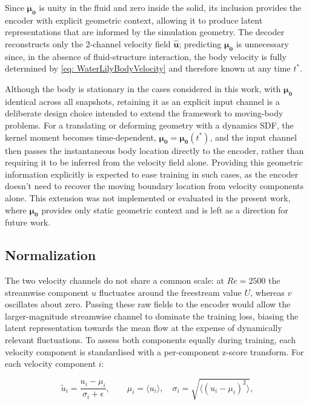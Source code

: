 Since $\boldsymbol{\mu_0}$ is unity in the fluid and zero inside the solid, its inclusion provides the encoder with explicit geometric context, allowing it to produce latent representations that are informed by the simulation geometry. The decoder reconstructs only the 2-channel velocity field $\hat{\mathbf{u}}$; predicting $\boldsymbol{\mu_0}$ is unnecessary since, in the absence of fluid-structure interaction, the body velocity is fully determined by \autoref{eq: WaterLilyBodyVelocity} and therefore known at any time $t^*$.

Although the body is stationary in the cases considered in this work, with $\boldsymbol{\mu_0}$ identical across all snapshots, retaining it as an explicit input channel is a deliberate design choice intended to extend the framework to moving-body problems. For a translating or deforming geometry with a dynamics SDF, the kernel moment becomes time-dependent, $\boldsymbol{\mu_0} = \boldsymbol{\mu_0}(t^*)$, and the input channel then passes the instantaneous body location directly to the encoder, rather than requiring it to be inferred from the velocity field alone. Providing this geometric information explicitly is expected to ease training in such cases, as the encoder doesn't need to recover the moving boundary location from velocity components alone. This extension was not implemented or evaluated in the present work, where $\boldsymbol{\mu_0}$ provides only static geometric context and is left as a direction for future work.


\subsection{Normalization}
\label{sect: normalization}

The two velocity channels do not share a common scale: at $Re=2500$ the streamwise component $u$ fluctuates around the freestream value $U$, whereas $v$ oscillates about zero. Passing these raw fields to the encoder would allow the larger-magnitude streamwise channel to dominate the training loss, biasing the latent representation towards the mean flow at the expense of dynamically relevant fluctuations. To assess both components equally during training, each velocity component is standardised with a per-component z-score transform. For each velocity component $i$:

\begin{equation}\label{eq: zscore}
    \tilde{u}_i = \frac{u_i - \mu_i}{\sigma_i + \epsilon},
    \qquad
    \mu_i = \langle u_i \rangle,
    \quad
    \sigma_i = \sqrt{\bigl\langle (u_i - \mu_i)^2 \bigr\rangle},
\end{equation}

